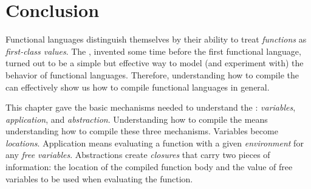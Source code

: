 \documentclass[12pt]{report}
\begin{document}




\section{Conclusion}
Functional languages distinguish themselves by their ability to treat
\emph{functions} as \emph{first-class values}. The \lamA, invented
some time before the first functional language, turned out to be a
simple but effective way to model (and experiment with) the behavior
of functional languages. Therefore, understanding how to compile the
\lamA can effectively show us how to compile functional languages in
general.

This chapter gave the basic mechanisms needed to understand the \lamA:
\emph{variables}, \emph{application}, and
\emph{abstraction}. Understanding how to compile the \lamA means
understanding how to compile these three mechanisms. Variables become
\emph{locations}. Application means evaluating a function with a given
\emph{environment} for any \emph{free variables}. Abstractions create
\emph{closures} that carry two pieces of information: the location of
the compiled function body and the value of free variables to be used
when evaluating the function.
\end{document}
